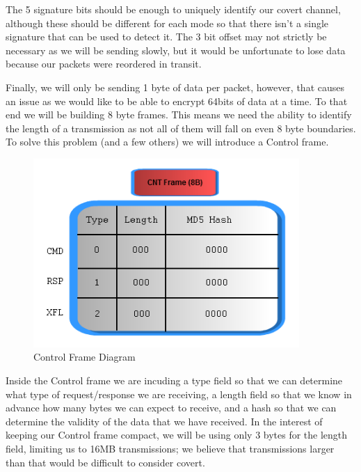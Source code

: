 \documentclass[titlepage]{article}
\begin{document}
The 5 signature bits should be enough to uniquely identify our covert channel, although these should be different for each mode so that there isn't a single signature that can
be used to detect it. The 3 bit offset may not strictly be necessary as we will be sending slowly, but it would be unfortunate to lose data because our packets were reordered in
transit.  

Finally, we will only be sending 1 byte of data per packet, however, that causes an issue as we would like to be able to encrypt 64bits of data at a time. To that end
we will be building 8 byte frames. This means we need the ability to identify the length of a transmission as not all of them will fall on even 8 byte boundaries.  To solve this problem
(and a few others) we will introduce a Control frame.

\clearpage

\begin{figure}[htb]                                                                       
  \begin{center}
    \includegraphics[width=0.9\textwidth]{imgs/frame.png}
  \end{center}
  \caption{Control Frame Diagram}
  \label{fig:frame}
\end{figure}

Inside the Control frame we are incuding a type field so that we can determine what type of request/response we are receiving, a length field so that we know in advance how
many bytes we can expect to receive, and a hash so that we can determine the validity of the data that we have received. In the interest of keeping our Control frame compact,
we will be using only 3 bytes for the length field, limiting us to 16MB transmissions; we believe that transmissions larger than that would be difficult to consider covert. 
\end{document}
